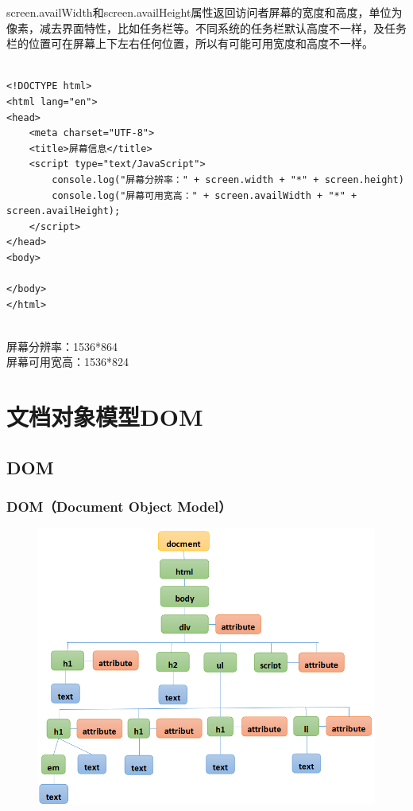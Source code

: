 screen.availWidth和screen.availHeight属性返回访问者屏幕的宽度和高度，单位为像素，减去界面特性，比如任务栏等。不同系统的任务栏默认高度不一样，及任务栏的位置可在屏幕上下左右任何位置，所以有可能可用宽度和高度不一样。 \\

 \\

\begin{lstlisting}[style=htmlcssjs]
<!DOCTYPE html>
<html lang="en">
<head>
    <meta charset="UTF-8">
    <title>屏幕信息</title>
    <script type="text/JavaScript">
        console.log("屏幕分辨率：" + screen.width + "*" + screen.height)
        console.log("屏幕可用宽高：" + screen.availWidth + "*" + screen.availHeight);
    </script>
</head>
<body>

</body>
</html>
\end{lstlisting}

\begin{tcolorbox}
	 \\
	屏幕分辨率：1536*864 \\
	屏幕可用宽高：1536*824
\end{tcolorbox}

\newpage

\chapter{文档对象模型DOM}

\section{DOM}

\subsection{DOM（Document Object Model）}

\begin{figure}[H]
    \centering
    \includegraphics[scale=0.8]{img/C17/17-1/1.png}
\end{figure}

